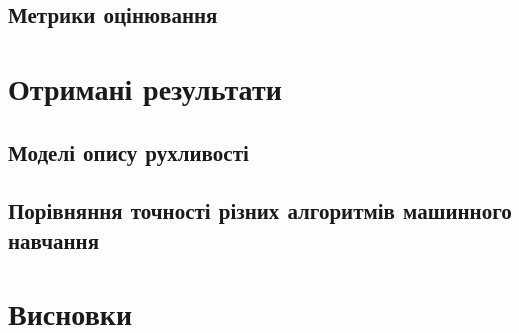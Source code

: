 \documentclass[10pt,a5paper,titlepage,oneside]{book}
\numberwithin{equation}{part}
\renewcommand{\theequation}{\thechapter.\arabic{equation}}
\begin{document}
\section{Метрики оцінювання}

\chapter{Отримані результати}

\section{Моделі опису рухливості}

\section{Порівняння точності різних алгоритмів машинного навчання}

\chapter*{Висновки}






%



\vspace{-5cm}
\setcounter{page}{3}







\end{document}
